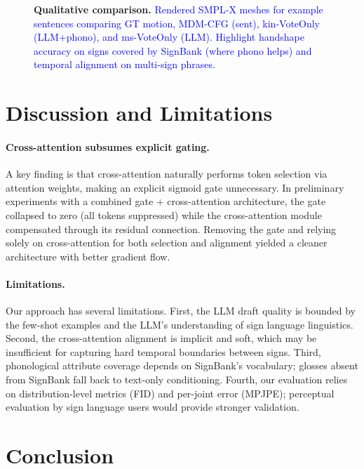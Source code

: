 \documentclass{article}
\newcommand{\placeholder}[1]{\textcolor{blue}{#1}}
\begin{document}
\begin{figure}[t]
    \centering
    \fbox{\rule[-.5cm]{0cm}{5cm} \rule[-.5cm]{13cm}{0cm}}
    \caption{\textbf{Qualitative comparison.}
    \placeholder{Rendered SMPL-X meshes for example sentences comparing GT motion, MDM-CFG (sent), kin-VoteOnly (LLM+phono), and ms-VoteOnly (LLM). Highlight handshape accuracy on signs covered by SignBank (where phono helps) and temporal alignment on multi-sign phrases.}}
    \label{fig:qualitative}
\end{figure}


\section{Discussion and Limitations}
\label{sec:discussion}

\paragraph{Cross-attention subsumes explicit gating.}
A key finding is that cross-attention naturally performs token selection via attention weights, making an explicit sigmoid gate unnecessary.
In preliminary experiments with a combined gate + cross-attention architecture, the gate collapsed to zero (all tokens suppressed) while the cross-attention module compensated through its residual connection.
Removing the gate and relying solely on cross-attention for both selection and alignment yielded a cleaner architecture with better gradient flow.

\paragraph{Limitations.}
Our approach has several limitations.
First, the LLM draft quality is bounded by the few-shot examples and the LLM's understanding of sign language linguistics.
Second, the cross-attention alignment is implicit and soft, which may be insufficient for capturing hard temporal boundaries between signs.
Third, phonological attribute coverage depends on SignBank's vocabulary; glosses absent from SignBank fall back to text-only conditioning.
Fourth, our evaluation relies on distribution-level metrics (FID) and per-joint error (MPJPE); perceptual evaluation by sign language users would provide stronger validation.


\section{Conclusion}
\label{sec:conclusion}
\end{document}
